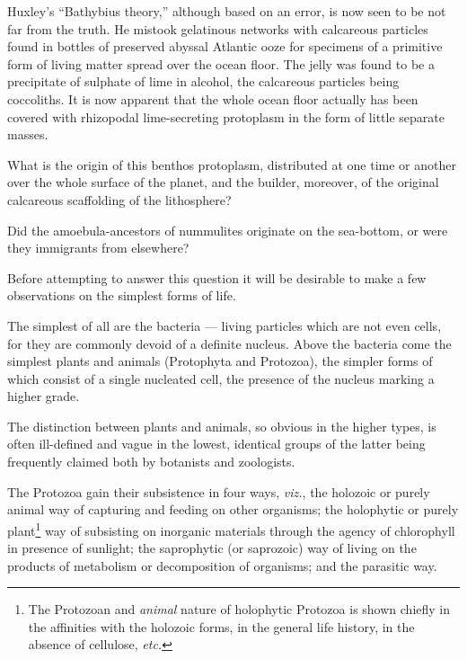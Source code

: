 \documentclass[a4paper, 12pt, oneside]{article}
\begin{document}
Huxley's ``Bathybius theory,'' although based on an error, is now seen to be not far from the truth. He mistook gelatinous networks with calcareous particles found in bottles of preserved abyssal Atlantic ooze for specimens of a primitive form of living matter spread over the ocean floor. The jelly was found to be a precipitate of sulphate of lime in alcohol, the calcareous particles being coccoliths. It is now apparent that the whole ocean floor actually has been covered with rhizopodal lime-secreting protoplasm in the form of little separate masses.

What is the origin of this benthos protoplasm, distributed at one time or another over the whole surface of the planet, and the builder, moreover, of the original calcareous scaffolding of the lithosphere?

Did the amoebula-ancestors of nummulites originate on the sea-bottom, or were they immigrants from elsewhere?

Before attempting to answer this question it will be desirable to make a few observations on the simplest forms of life.

The simplest of all are the bacteria --- living particles which are not even cells, for they are commonly devoid of a definite nucleus. Above the bacteria come the simplest plants and animals (Protophyta and Protozoa), the simpler forms of which consist of a single nucleated cell, the presence of the nucleus marking a higher grade.

The distinction between plants and animals, so obvious in the higher types, is often ill-defined and vague in the lowest, identical groups of the latter being frequently claimed both by botanists and zoologists.

The Protozoa gain their subsistence in four ways, \emph{viz.}, the holozoic or purely animal way of capturing and feeding on other organisms; the holophytic or purely plant\footnote{The Protozoan and \emph{animal} nature of holophytic Protozoa is shown chiefly in the affinities with the holozoic forms, in the general life history, in the absence of cellulose, \emph{etc.}} way of subsisting on inorganic materials through the agency of chlorophyll in presence of sunlight; the saprophytic (or saprozoic) way of living on the products of metabolism or decomposition of organisms; and the parasitic way.
\end{document}
